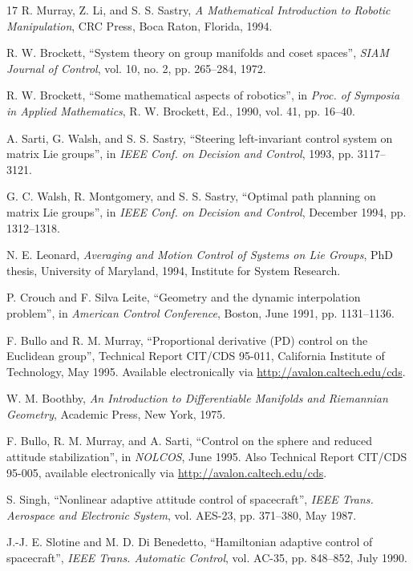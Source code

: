 \documentclass[10pt,twocolumn]{article}
\begin{document}
\begin{thebibliography}{17}\small
{} R. Murray, Z. Li, and S. S. Sastry, \emph{A Mathematical Introduction to Robotic Manipulation}, CRC Press, Boca Raton, Florida, 1994.

 R. W. Brockett, ``System theory on group manifolds and coset spaces'', \emph{SIAM Journal of Control}, vol. 10, no. 2, pp. 265--284, 1972.

 R. W. Brockett, ``Some mathematical aspects of robotics'', in \emph{Proc. of Symposia in Applied Mathematics}, R. W. Brockett, Ed., 1990, vol. 41, pp. 16--40.

 A. Sarti, G. Walsh, and S. S. Sastry, ``Steering left-invariant control system on matrix Lie groups'', in \emph{IEEE Conf. on Decision and Control}, 1993, pp. 3117--3121.

 G. C. Walsh, R. Montgomery, and S. S. Sastry, ``Optimal path planning on matrix Lie groups'', in \emph{IEEE Conf. on Decision and Control}, December 1994, pp. 1312--1318.

 N. E. Leonard, \emph{Averaging and Motion Control of Systems on Lie Groups}, PhD thesis, University of Maryland, 1994, Institute for System Research.

 P. Crouch and F. Silva Leite, ``Geometry and the dynamic interpolation problem'', in \emph{American Control Conference}, Boston, June 1991, pp. 1131--1136.

 F. Bullo and R. M. Murray, ``Proportional derivative (PD) control on the Euclidean group'', Technical Report CIT/CDS 95-011, California Institute of Technology, May 1995. Available electronically via \url{http://avalon.caltech.edu/cds}.

 W. M. Boothby, \emph{An Introduction to Differentiable Manifolds and Riemannian Geometry}, Academic Press, New York, 1975.

 F. Bullo, R. M. Murray, and A. Sarti, ``Control on the sphere and reduced attitude stabilization'', in \emph{NOLCOS}, June 1995. Also Technical Report CIT/CDS 95-005, available electronically via \url{http://avalon.caltech.edu/cds}.

 S. Singh, ``Nonlinear adaptive attitude control of spacecraft'', \emph{IEEE Trans. Aerospace and Electronic System}, vol. AES-23, pp. 371--380, May 1987.

 J.-J. E. Slotine and M. D. Di Benedetto, ``Hamiltonian adaptive control of spacecraft'', \emph{IEEE Trans. Automatic Control}, vol. AC-35, pp. 848--852, July 1990.


\end{thebibliography}
\end{document}
